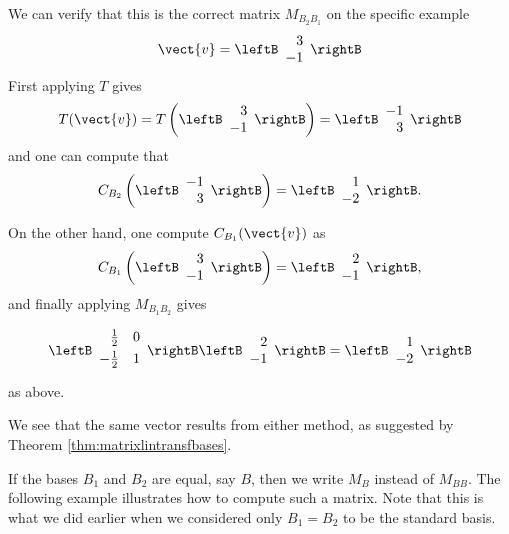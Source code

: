 \begin{solution}
We can verify that this is the correct matrix $M_{B_{2} B_{1}}$ on the specific example
\[
\vect{v} = \leftB 
\begin{array}{r}
3 \\
-1 
\end{array}
\rightB \]
First applying $T$ gives
\[
T( \vect{v} ) =
T \left( 
\leftB 
\begin{array}{r}
3 \\
-1 
\end{array}
\rightB \right) = \leftB 
\begin{array}{r}
-1\\
3
\end{array}
\rightB
\]
and one can compute that  
\[ C_{B_2} 
 \left( 
\leftB 
\begin{array}{r}
-1 \\
3 
\end{array}
\rightB \right) = \leftB 
\begin{array}{r}
1\\
-2
\end{array}
\rightB .\]

On the other hand, one compute $C_{B_1}( \vect{v})$ as 
\[ C_{B_1} 
 \left( 
\leftB 
\begin{array}{r}
3 \\
-1 
\end{array}
\rightB \right) = \leftB 
\begin{array}{r}
2\\
-1
\end{array}
\rightB ,\]
and finally applying $M_{B_1 B_2}$ gives

\[\leftB
\begin{array}{rr}
\vspace{0.05in}\frac{1}{2} & 0 \\
\vspace{0.05in}-\frac{1}{2} & 1 
\end{array}
\rightB 
\leftB \begin{array}{r}
2 \\
-1
\end{array}\rightB 
= \leftB \begin{array}{r}
1 \\
-2
\end{array}
\rightB \]
as above. 

We see that the same vector results from either method, as suggested by Theorem \ref{thm:matrixlintransfbases}.
\end{solution}

If the bases $B_1$ and $B_2$ are equal, say $B$, then we write $M_{B}$ instead of  $M_{B B}$. 
The following example illustrates how to compute  such a matrix. Note that this is what we did earlier when we considered only
$B_1=B_2$ to be the standard basis. 

